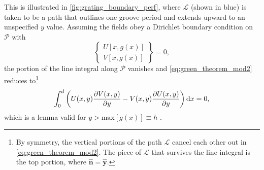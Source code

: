This is illustrated in \cref{fig:grating_boundary_perf}, where $\mathcal{L}$ (shown in blue) is taken to be a path that outlines one groove period and extends upward to an unspecified $y$ value. 
Assuming the fields obey a Dirichlet boundary condition on $\mathcal{P}$ with 
\begin{equation}
\left\{
 \begin{array}{lr}
 U \left[ x, g(x) \right] \\
 V \left[ x, g(x) \right] 
 \end{array}
 \right\} = 0 ,
\end{equation}
the portion of the line integral along $\mathcal{P}$ vanishes and \cref{eq:green_theorem_mod2} reduces to\footnote{By symmetry, the vertical portions of the path $\mathcal{L}$ cancel each other out in \cref{eq:green_theorem_mod2}. The piece of $\mathcal{L}$ that survives the line integral is the top portion, where $\mathbold{\hat{n}} = \mathbold{\hat{y}}$.} 
\begin{equation}\label{eq:grat_lemma1}
 \int_0^d \left( U (x,y) \pdv{V (x,y)}{y} - V (x,y) \pdv{U (x,y)}{y} \right) \dd{x} = 0 ,
 \end{equation}
which is a lemma valid for $y > \text{max} [g(x)] \equiv h$ \cite{Petit80}. 

